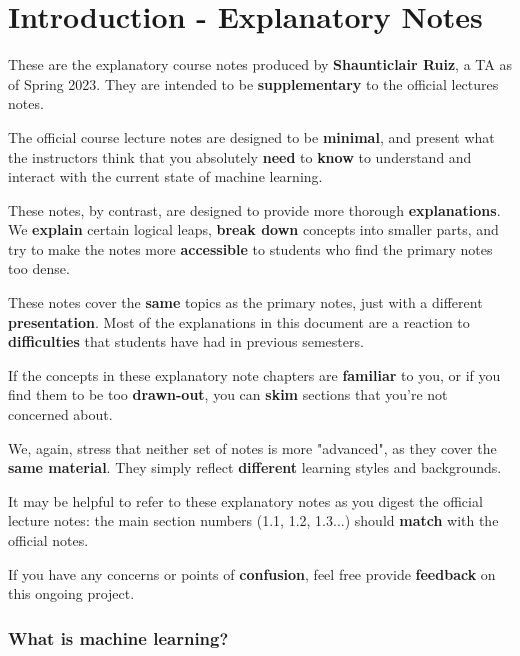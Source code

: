 \chapter{Introduction - Explanatory Notes}
\label{intro}



These are the explanatory course notes produced by \textbf{Shaunticlair Ruiz}, a TA as of Spring 2023. They are intended to be \textbf{supplementary} to the official lectures notes.

The official course lecture notes are designed to be \textbf{minimal}, and present what the instructors think that you absolutely \textbf{need} to \textbf{know} to understand and interact with the current state of machine learning.

These notes, by contrast, are designed to provide more thorough \textbf{explanations}. We \textbf{explain} certain logical leaps, \textbf{break down} concepts into smaller parts, and try to make the notes more \textbf{accessible} to students who find the primary notes too dense.

These notes cover the \textbf{same} topics as the primary notes, just with a different \textbf{presentation}. Most of the explanations in this document are a reaction to \textbf{difficulties} that students have had in previous semesters.

If the concepts in these explanatory note chapters are \textbf{familiar} to you, or if you find them to be too \textbf{drawn-out}, you can \textbf{skim} sections that you're not concerned about. 

We, again, stress that neither set of notes is more "advanced", as they cover the \textbf{same material}. They simply reflect \textbf{different} learning styles and backgrounds. 

It may be helpful to refer to these explanatory notes as you digest the official lecture notes: the main section numbers (1.1, 1.2, 1.3...) should \textbf{match} with the official notes.

If you have any concerns or points of \textbf{confusion}, feel free provide \textbf{feedback} on this ongoing project.

\pagebreak



    \subsection{What is machine learning?} %
    
